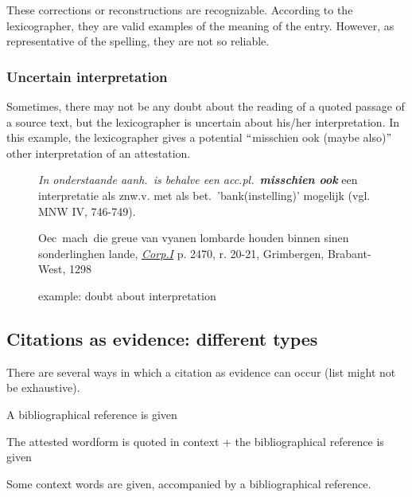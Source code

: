 \documentclass[10pt]{article}
\let\tempeone\enumerate
\let\tempetwo\endenumerate
\renewenvironment{enumerate}{\tempeone\setlength\itemsep{-0.5pt}\setlength{\partopsep}{-0.5pt}\setlength{\parsep}{-0.5pt}\setlength{\topsep}{-0.5pt}}{\tempetwo}
\begin{document}
These corrections or reconstructions are recognizable. According to the lexicographer, they are valid examples of the meaning of the entry. However, as representative of the spelling, they are not so reliable.\par



\subsubsection*{Uncertain interpretation}



Sometimes, there may not be any doubt about the reading of a quoted passage of a source text, but the lexicographer is uncertain about his/her interpretation. In this example, the lexicographer gives a potential $``$misschien ook (maybe also)$"$  other interpretation of an attestation.

\bigskip

\begin{figure}[H]
\begin{minipage}{14cm}
{
\small
\textit{In onderstaande aanh.~is behalve een acc.pl.~}\textbf{\textit{misschien ook}}  een interpretatie als znw.v. met als bet.~'bank(instelling)' mogelijk (vgl. MNW IV, 746-749).


 Oec\ mach\ die greue van vyanen lombarde houden binnen sinen sonderlinghen lande,   \href{http://gtb.ivdnt.org/iWDB/search?actie=article&wdb=VMNWBRONNEN&id=1646}{\textit{\uline{Corp.I}}} p. 2470, r. 20-21, Grimbergen, Brabant-West, 1298
}
\end{minipage}
\caption{example: doubt about interpretation}
\end{figure}


\subsection{Citations as evidence: different types}


 There are several ways in which a citation as evidence can occur (list might not be exhaustive).\par



\begin{enumerate}
	\item  A bibliographical reference is given

	\item The attested wordform is quoted in context + the bibliographical reference is given

	\item Some context words are given, accompanied by a bibliographical reference.
\end{enumerate}
\end{document}
